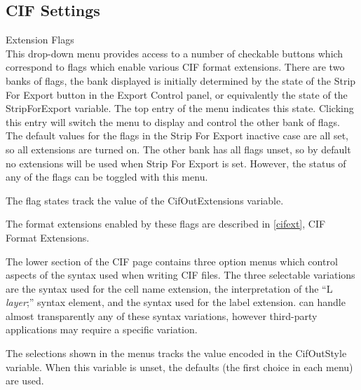 \subsection{CIF Settings}
\label{cifsettings}

\begin{description}
\item{\cb Extension Flags}\\
This drop-down menu provides access to a number of checkable buttons
which correspond to flags which enable various CIF format extensions. 
There are two banks of flags, the bank displayed is initially
determined by the state of the {\cb Strip For Export} button in the
{\cb Export Control} panel, or equivalently the state of the {\et
StripForExport} variable.  The top entry of the menu indicates this
state.  Clicking this entry will switch the menu to display and
control the other bank of flags.  The default values for the flags in
the {\cb Strip For Export} inactive case are all set, so all
extensions are turned on.  The other bank has all flags unset, so by
default no extensions will be used when {\et Strip For Export} is set. 
However, the status of any of the flags can be toggled with this menu.

The flag states track the value of the {\et CifOutExtensions}
variable.

The format extensions enabled by these flags are described in
\ref{cifext}, CIF Format Extensions.
\end{description}

The lower section of the CIF page contains three option menus which
control aspects of the syntax used when writing CIF files.  The three
selectable variations are the syntax used for the cell name extension,
the interpretation of the ``{\vt L} {\it layer\/}{\vt ;}'' syntax
element, and the syntax used for the label extension.  {\Xic} can
handle almost transparently any of these syntax variations, however
third-party applications may require a specific variation.

The selections shown in the menus tracks the value encoded in the {\et
CifOutStyle} variable.  When this variable is unset, the defaults (the
first choice in each menu) are used.

